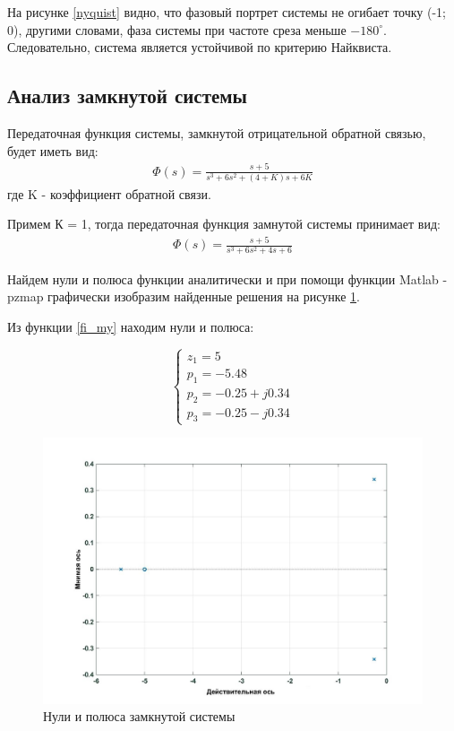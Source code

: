 \documentclass[a4paper, 12pt]{article}
\begin{document}
На рисунке \ref{nyquist} видно, что фазовый портрет системы не огибает точку (-1; 0), другими словами, фаза системы при частоте среза меньше $-180^{\circ}.$ Следовательно, система является устойчивой по критерию Найквиста.

\newpage

\begin{center}
	\section{Анализ замкнутой системы}
\end{center}

Передаточная функция системы, замкнутой отрицательной обратной связью, будет иметь вид:
\begin{align}
\Phi(s) = \frac{s + 5}{s^3 + 6s^2 + (4+K)s + 6K}
\end{align}
где K - коэффициент обратной связи.\par
Примем К = 1, тогда передаточная функция замнутой системы принимает вид:
\begin{align}
	\Phi(s) = \frac{s + 5}{s^3 + 6s^2 + 4s + 6}
	\label{fi_my}
\end{align}

Найдем нули и полюса функции аналитически и при помощи функции Matlab - pzmap графически изобразим найденные решения на рисунке \ref{pzmap2}.\par

Из функции \ref{fi_my}  находим нули и полюса:

\begin{equation}
\begin{cases}
z_1 = 5\\	
p_1 = -5.48\\	
p_2 = -0.25 + j0.34\\	
p_3 = -0.25 - j0.34
\end{cases}
\end{equation}

\begin{figure}[h!]
	\centering
	\includegraphics[width = 0.6\textheight]{data/pzmap2}
	\caption{Нули и полюса замкнутой системы}
	\label{pzmap2}
\end{figure}\par
\end{document}
